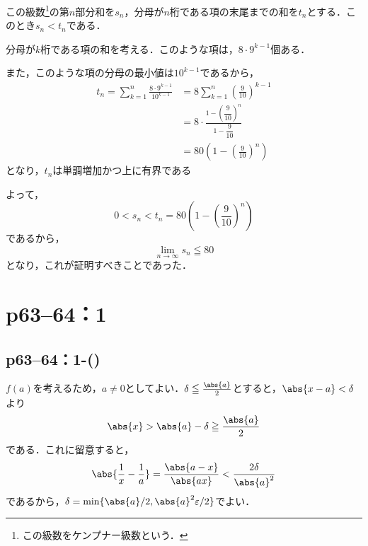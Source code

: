 \begin{tproof}
    この級数\footnote{この級数をケンプナー級数という．}の第$n$部分和を$s_n$，分母が$n$桁である項の末尾までの和を$t_n$とする．このとき$s_n < t_n$である．

    分母が$k$桁である項の和を考える．このような項は，$8 \cdot 9^{k-1}$個ある．

    また，このような項の分母の最小値は$10^{k-1}$であるから，
    \begin{align*}
        t_n = \sum_{k=1}^{n} \frac{8 \cdot 9^{k-1}}{10^{k-1}} & = 8 \sum_{k=1}^{n} \left(\frac{9}{10}\right)^{k-1}               \\
                                                              & = 8 \cdot \frac{1-\left(\dfrac{9}{10}\right)^n}{1-\dfrac{9}{10}} \\
                                                              & = 80 \left(1-\left(\frac{9}{10}\right)^n\right)
    \end{align*}
    となり，$t_n$は単調増加かつ上に有界である

    よって，
    \[
        0 < s_n < t_n = 80 \left(1-\left(\frac{9}{10}\right)^n\right)
    \]
    であるから，
    \[
        \lim_{n \to \infty} s_n \leqq 80
    \]
    となり，これが証明すべきことであった．
\end{tproof}





\section*{p63--64：1}

\subsection*{p63--64：1-()}

\begin{tanswer}
    $f(a)$を考えるため，$a \ne 0$としてよい．$\delta \le \frac{\abs{a}}{2}$とすると，$\abs{x-a}<\delta$より
    \[
        \abs{x} > \abs{a}-\delta \ge \frac{\abs{a}}{2}
    \]
    である．これに留意すると，
    \[
        \abs{\frac{1}{x}-\frac{1}{a}}=\frac{\abs{a-x}}{\abs{ax}} <\frac{2 \delta}{\abs{a}^2}
    \]
    であるから，$\delta = \min \{ \abs{a}/2,\abs{a}^2\varepsilon/2 \}$でよい．
\end{tanswer}



